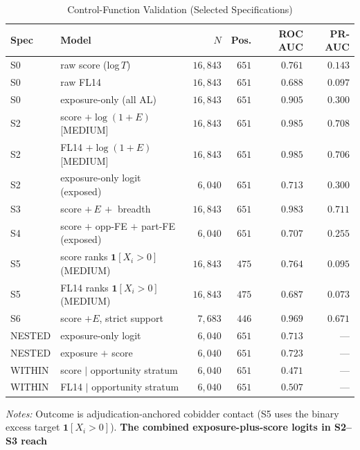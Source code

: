 \begin{table}[htbp]
\centering
\caption{Control-Function Validation (Selected Specifications)}
\label{tab:control_function_submission}
\scriptsize
\begin{adjustbox}{max width=\textwidth,center}
\begin{threeparttable}
\begin{tabular}{lL{4.0cm}rrrr}
\toprule
Spec & Model & $N$ & Pos. & ROC AUC & PR-AUC \\
\midrule
S0 & raw score (log\,$T$) & $16{,}843$ & $651$ & $0.761$ & $0.143$ \\
S0 & raw FL14 & $16{,}843$ & $651$ & $0.688$ & $0.097$ \\
S0 & exposure-only (all AL) & $16{,}843$ & $651$ & $0.905$ & $0.300$ \\
S2 & score $+\log(1{+}E)$ [MEDIUM] & $16{,}843$ & $651$ & $0.985$ & $0.708$ \\
S2 & FL14 $+\log(1{+}E)$ [MEDIUM] & $16{,}843$ & $651$ & $0.985$ & $0.706$ \\
S2 & exposure-only logit (exposed) & $6{,}040$ & $651$ & $0.713$ & $0.300$ \\
S3 & score $+\,E\,+$ breadth & $16{,}843$ & $651$ & $0.983$ & $0.711$ \\
S4 & score $+$ opp-FE $+$ part-FE (exposed) & $6{,}040$ & $651$ & $0.707$ & $0.255$ \\
S5 & score ranks $\mathbf{1}[X_i{>}0]$ (MEDIUM) & $16{,}843$ & $475$ & $0.764$ & $0.095$ \\
S5 & FL14 ranks $\mathbf{1}[X_i{>}0]$ (MEDIUM) & $16{,}843$ & $475$ & $0.687$ & $0.073$ \\
S6 & score $+E$, strict support & $7{,}683$ & $446$ & $0.969$ & $0.671$ \\
NESTED & exposure-only logit & $6{,}040$ & $651$ & $0.713$ & --- \\
NESTED & exposure $+$ score & $6{,}040$ & $651$ & $0.723$ & --- \\
WITHIN & score $\mid$ opportunity stratum & $6{,}040$ & $651$ & $0.471$ & --- \\
WITHIN & FL14 $\mid$ opportunity stratum & $6{,}040$ & $651$ & $0.507$ & --- \\
\bottomrule
\end{tabular}
\begin{tablenotes}
\scriptsize
\item \textit{Notes:} Outcome is adjudication-anchored cobidder
contact (S5 uses the binary excess target $\mathbf{1}[X_i>0]$).
\textbf{The combined exposure-plus-score logits in S2--S3 reach
}
\end{tablenotes}
\end{threeparttable}
\end{adjustbox}
\end{table}

